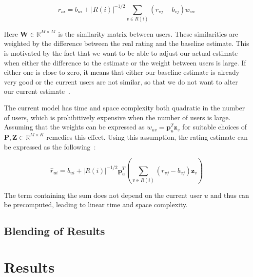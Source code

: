 \documentclass[10pt,conference,compsocconf]{IEEEtran}
\newcommand{\abs}[1]{\left\lvert#1\right\rvert}
\begin{document}
\begin{equation}
  \hat{r}_{ui} = b_{ui} + \abs{R(i)}^{-1/2} \sum_{v \in R(i)} (r_{vj} -
  b_{vj})w_{uv}
\end{equation}

Here $\mathbf W \in \mathbb R^{M \times M}$ is the similarity matrix between
users. These similarities are weighted by the difference between the real
rating and the baseline estimate. This is motivated by the fact that we want
to be able to adjust our actual estimate when either the difference to the
estimate or the weight between users is large. If either one is close to zero,
it means that either our baseline estimate is already very good or the current
users are not similar, so that we do not want to alter our current
estimate~\cite{koren2010factor, koren2011advances}.

The current model has time and space complexity both quadratic in the number of
users, which is prohibitively expensive when the number of users is large.
Assuming that the weights can be expressed as $w_{uv} = \mathbf p_u^T \mathbf
z_v$ for suitable choices of $\mathbf P, \mathbf Z \in \mathbb R^{M\times K}$
remedies this effect. Using this assumption, the rating estimate can be
expressed as the following~\cite{koren2010factor, koren2011advances}:

\begin{equation}
  \hat{r}_{ui} = b_{ui} + \abs{R(i)}^{-1/2} \mathbf p_u^T \left( \sum_{v \in
      R(i)} (r_{vj} - b_{vj}) \mathbf z_v \right )
\end{equation}

The term containing the sum does not depend on the current user $u$ and thus
can be precomputed, leading to linear time and space complexity.


\subsection{Blending of Results}
\label{sub:blending_of_results}




\section{Results}
\label{sec:results}
\end{document}

